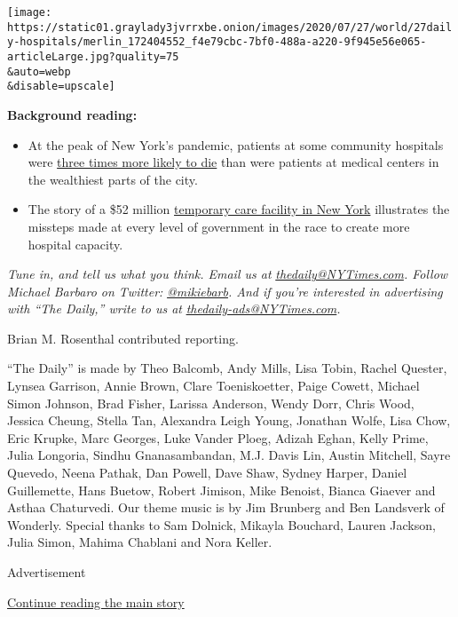 \texttt{[image: https://static01.graylady3jvrrxbe.onion/images/2020/07/27/world/27daily-hospitals/merlin\_172404552\_f4e79cbc-7bf0-488a-a220-9f945e56e065-articleLarge.jpg?quality=75\\\&auto=webp\\\&disable=upscale]}

\textbf{Background reading:}

\begin{itemize}
\item
  At the peak of New York's pandemic, patients at some community
  hospitals were
  \href{https://www.nytimes3xbfgragh.onion/2020/07/01/nyregion/Coronavirus-hospitals.html}{three
  times more likely to die} than were patients at medical centers in the
  wealthiest parts of the city.
\item
  The story of a \$52 million
  \href{https://www.nytimes3xbfgragh.onion/2020/07/21/nyregion/coronavirus-hospital-usta-queens.html}{temporary
  care facility in New York} illustrates the missteps made at every
  level of government in the race to create more hospital capacity.
\end{itemize}

\emph{Tune in, and tell us what you think. Email us at}
\href{mailto:thedaily@NYTimes.com}{\emph{thedaily@NYTimes.com}}\emph{.
Follow Michael Barbaro on Twitter:}
\href{https://twitter.com/mikiebarb}{\emph{@mikiebarb}}\emph{. And if
you're interested in advertising with ``The Daily,'' write to us at}
\href{mailto:thedaily-ads@NYTimes.com}{\emph{thedaily-ads@NYTimes.com}}\emph{.}

Brian M. Rosenthal contributed reporting.

``The Daily'' is made by Theo Balcomb, Andy Mills, Lisa Tobin, Rachel
Quester, Lynsea Garrison, Annie Brown, Clare Toeniskoetter, Paige
Cowett, Michael Simon Johnson, Brad Fisher, Larissa Anderson, Wendy
Dorr, Chris Wood, Jessica Cheung, Stella Tan, Alexandra Leigh Young,
Jonathan Wolfe, Lisa Chow, Eric Krupke, Marc Georges, Luke Vander Ploeg,
Adizah Eghan, Kelly Prime, Julia Longoria, Sindhu Gnanasambandan, M.J.
Davis Lin, Austin Mitchell, Sayre Quevedo, Neena Pathak, Dan Powell,
Dave Shaw, Sydney Harper, Daniel Guillemette, Hans Buetow, Robert
Jimison, Mike Benoist, Bianca Giaever and Asthaa Chaturvedi. Our theme
music is by Jim Brunberg and Ben Landsverk of Wonderly. Special thanks
to Sam Dolnick, Mikayla Bouchard, Lauren Jackson, Julia Simon, Mahima
Chablani and Nora Keller.

Advertisement

\protect\hyperlink{after-bottom}{Continue reading the main story}

